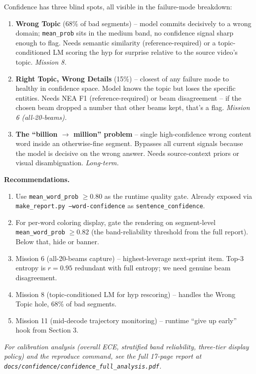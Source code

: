 \documentclass[10pt, a4paper]{article}
\begin{document}
Confidence has three blind spots, all visible in the failure-mode breakdown:

\begin{enumerate}[leftmargin=*, itemsep=2pt, topsep=2pt]
  \item \textbf{Wrong Topic} (68\% of bad segments) -- model commits decisively to a wrong domain; \texttt{mean\_prob} sits in the medium band, no confidence signal sharp enough to flag. Needs semantic similarity (reference-required) or a topic-conditioned LM scoring the hyp for surprise relative to the source video's topic. \emph{Mission 8.}
  \item \textbf{Right Topic, Wrong Details} (15\%) -- closest of any failure mode to healthy in confidence space. Model knows the topic but loses the specific entities. Needs NEA F1 (reference-required) or beam disagreement -- if the chosen beam dropped a number that other beams kept, that's a flag. \emph{Mission 6 (all-20-beams).}
  \item \textbf{The ``billion $\to$ million'' problem} -- single high-confidence wrong content word inside an otherwise-fine segment. Bypasses all current signals because the model is decisive on the wrong answer. Needs source-context priors or visual disambiguation. \emph{Long-term.}
\end{enumerate}

\textbf{Recommendations.}

\begin{enumerate}[leftmargin=*, itemsep=2pt, topsep=2pt]
  \item Use \texttt{mean\_word\_prob} $\ge 0.80$ as the runtime quality gate. Already exposed via \texttt{make\_report.py --word-confidence} as \texttt{sentence\_confidence}.
  \item For per-word coloring display, gate the rendering on segment-level \texttt{mean\_word\_prob} $\ge 0.82$ (the band-reliability threshold from the full report). Below that, hide or banner.
  \item Mission 6 (all-20-beams capture) -- highest-leverage next-sprint item. Top-3 entropy is $r=0.95$ redundant with full entropy; we need genuine beam disagreement.
  \item Mission 8 (topic-conditioned LM for hyp rescoring) -- handles the Wrong Topic hole, 68\% of bad segments.
  \item Mission 11 (mid-decode trajectory monitoring) -- runtime ``give up early'' hook from Section 3.
\end{enumerate}

\vspace{0.3em}
\noindent\textcolor{argosGray}{\small\emph{For calibration analysis (overall ECE, stratified band reliability, three-tier display policy) and the reproduce command, see the full 17-page report at \texttt{docs/confidence/confidence\_full\_analysis.pdf}.}}
\end{document}

